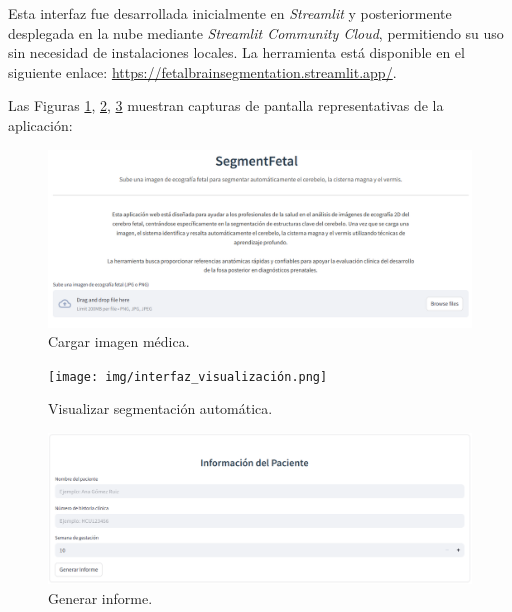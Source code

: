 Esta interfaz fue desarrollada inicialmente en \textit{Streamlit} y posteriormente desplegada en la nube mediante \textit{Streamlit Community Cloud}, permitiendo su uso sin necesidad de instalaciones locales. La herramienta está disponible en el siguiente enlace: \url{https://fetalbrainsegmentation.streamlit.app/}.

Las Figuras \ref{fig:subir_imagen}, \ref{fig: visualizar_segmentación}, \ref{fig: generar_informe} muestran capturas de pantalla representativas de la aplicación:

\begin{figure}[h]
    \centering
    \includegraphics[width=1\textwidth]{img/interfaz_subir_imagen.png}
    \caption{Cargar imagen médica.}
    \label{fig:subir_imagen}
\end{figure}

\begin{figure}[h]
    \centering
    \texttt{[image: img/interfaz\_visualización.png]}
    \caption{Visualizar segmentación automática.}
    \label{fig: visualizar_segmentación}
\end{figure}

\begin{figure}[h]
    \centering
    \includegraphics[width=1\textwidth]{img/interfaz_generar_informe.png}
    \caption{Generar informe.}
    \label{fig: generar_informe}
\end{figure}
